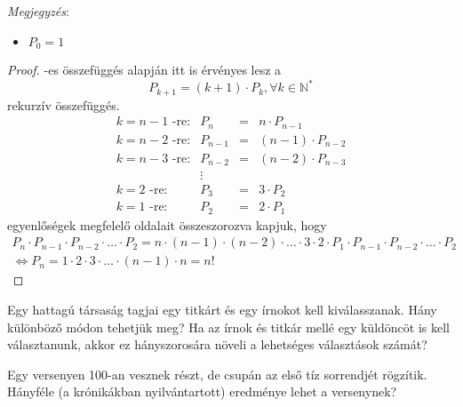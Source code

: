 \textit{Megjegyzés}: 
\begin{itemize}
\item $P_{0}=1$ 
\end{itemize}
\begin{proof}
-es összefüggés alapján itt is érvényes
lesz a 
\[
P_{k+1}=(k+1)\cdot P_{k},\forall k\in\mathbb{N}^{*}
\]
rekurzív összefüggés. 
\[
\begin{array}{llcl}
k=n-1\text{ -re:} & P_{n} & = & n\cdot P_{n-1}\\
k=n-2\text{ -re:} & P_{n-1} & = & (n-1)\cdot P_{n-2}\\
k=n-3\text{ -re:} & P_{n-2} & = & (n-2)\cdot P_{n-3}\\
 & \vdots\\
k=2\text{ -re:} & P_{3} & = & 3\cdot P_{2}\\
k=1\text{ -re:} & P_{2} & = & 2\cdot P_{1}
\end{array}
\]
egyenlőségek megfelelő oldalait összeszorozva kapjuk, hogy 
\[
\begin{array}{c}
P_{n}\cdot P_{n-1}\cdot P_{n-2}\cdot\ldots\cdot P_{2}=n\cdot(n-1)\cdot(n-2)\cdot\ldots\cdot3\cdot2\cdot P_{1}\cdot P_{n-1}\cdot P_{n-2}\cdot\ldots\cdot P_{2}\\
\Leftrightarrow P_{n}=1\cdot2\cdot3\cdot\ldots\cdot(n-1)\cdot n=n!
\end{array}
\]
\end{proof}
\begin{problem}
\label{fel4} Egy hattagú társaság tagjai egy titkárt és egy írnokot
kell kiválasszanak. Hány különböző módon tehetjük meg? Ha az írnok
és titkár mellé egy küldöncöt is kell választanunk, akkor ez hányszorosára
növeli a lehetséges választások számát? 
\end{problem}

\begin{problem}
\label{fel5} Egy versenyen 100-an vesznek részt, de csupán az első
tíz sorrendjét rögzítik. Hányféle (a krónikákban nyilvántartott) eredménye
lehet a versenynek? 
\end{problem}


